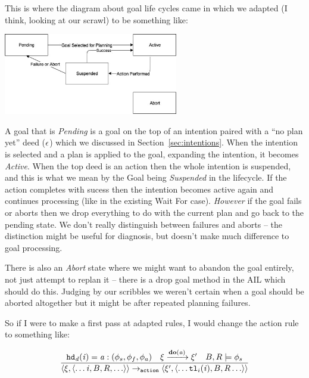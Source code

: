 \documentclass{blue-book}
\begin{document}
This is where the diagram about goal life cycles came in which we adapted (I think,  looking at our scrawl) to be something like:

\begin{center}
\includegraphics[width=3in]{images/lifecycle.jpg}
\end{center}

A goal that is \emph{Pending} is a goal on the top of an intention paired with a ``no plan yet'' deed ($\epsilon$) which we discussed in Section~\ref{sec:intentions}.  When the intention is selected and a plan is applied to the goal, expanding the intention, it becomes \emph{Active}.  When the top deed is an action then the whole intention is suspended, and this is what we mean by the Goal being \emph{Suspended} in the lifecycle.  If the action completes with sucess then the intention becomes active again and continues processing (like in the existing Wait For case).  \emph{However} if the goal fails or aborts then we drop everything to do with the current plan and go back to the pending state.  We don't really distinguish between failures and aborts -- the distinction might be useful for diagnosis, but doesn't make much difference to goal processing.

There is also an \emph{Abort} state where we might want to abandon the goal entirely, not just attempt to replan it -- there is a drop goal method in the AIL which should do this.  Judging by our scribbles we weren't certain when a goal should be aborted altogether but it might be after repeated planning failures.

So if I were to make a first pass at adapted rules, I would change the action rule to something like: 

\begin{equation}
  \frac{
    \mathit{{\tt hd}_d}(\mathit{i}) = \mathit{a}:(\phi_s,\phi_f,\phi_a)
\quad \xi \xrightarrow{\mathrm{\mathbf{do}}(\mathit{a})} \xi'  \quad B, R \models \phi_s
}{
\langle \xi, \langle \ldots \mathit{i}, B, R, \ldots \rangle \rangle \rightarrow_{\tt action} 
\langle \xi', \langle \ldots {\tt tl}_i(\mathit{i}), B, R \ldots \rangle \rangle
}
\label{eq:action_success}
\end{equation}
\end{document}
